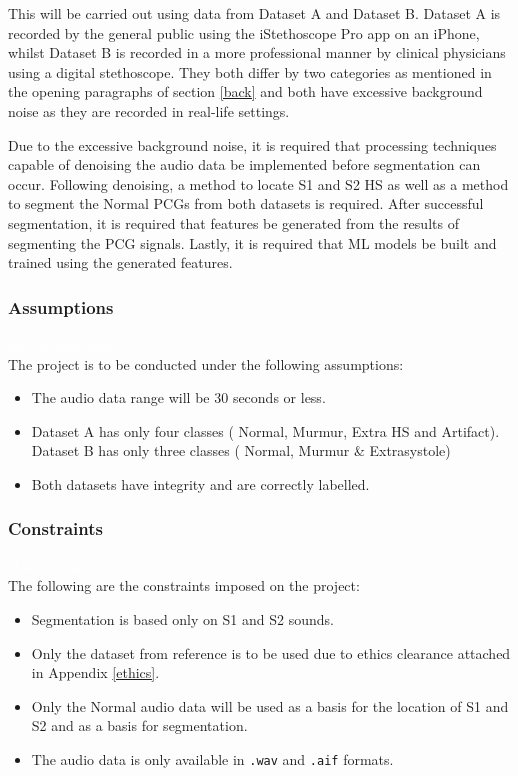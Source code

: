 \documentclass[10pt,twocolumn]{witseiepaper}
\begin{document}
This will be carried out using data from Dataset A and Dataset B. Dataset A is recorded by the general public using the iStethoscope Pro app on an iPhone, whilst Dataset B is recorded in a more professional manner by clinical physicians using a digital stethoscope. They both differ by two categories as mentioned in the opening paragraphs of section \ref{back} and both have excessive background noise as they are recorded in real-life settings. 

Due to the excessive background noise, it is required that processing techniques capable of denoising the audio data be implemented before segmentation can occur. Following denoising, a method to locate S1 and S2 HS as well as a method to segment the Normal PCGs from both datasets is required. After successful segmentation, it is required that features be generated from the results of segmenting the PCG signals. Lastly, it is required that ML models be built and trained using the generated features. 

\subsubsection{Assumptions}
\textcolor{white}{Ke a leboga Jeso}\\
The project is to be conducted under the following assumptions:
\begin{itemize}
    \item The audio data range will be 30 seconds or less.
    \item Dataset A has only four classes ( Normal, Murmur, Extra HS and Artifact). Dataset B has only three classes ( Normal, Murmur \& Extrasystole)
    \item Both datasets have integrity and are correctly labelled.
\end{itemize}

\subsubsection{Constraints}
\label{sec:constraints}
\textcolor{white}{O re swarele...}\\
The following are the constraints imposed on the project:
\begin{itemize}
    \item Segmentation is based only on S1 and S2 sounds.
    \item Only the dataset from reference \cite{bentley} is to be used due to ethics clearance attached in Appendix \ref{ethics}.
    \item Only the Normal audio data will be used as a basis for the location of S1 and S2 and as a basis for segmentation.
    \item The audio data is only available in \texttt{.wav} and \texttt{.aif} formats.
\end{itemize}
\end{document}
